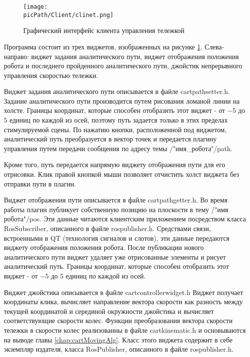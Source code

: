 \documentclass[oneside,final,14pt]{extreport}
\newcommand{\picPath}{img}
\begin{document}
\begin{figure}[H]
\begin{center}
\texttt{[image: \\picPath/Client/clinet.png]}
\end{center}
  \caption{ Графический интерфейс клиента управления тележкой }
  \label{Figure:client}
\end{figure}

Программа состоит из трех виджетов, изображенных на рисунке \ref{Figure:client}. Слева-направо: виджет задания аналитического пути, виджет отображения положения робота и последнего пройденного аналитического пути, джойстик непрерывного управления скоростью тележки.   

Виджет задания аналитического пути описывается в файле cartpathsetter.h. 
Задание аналитического пути производится путем рисования ломаной линии на холсте. Границы координат, которые способен отобразить этот виджет -  от $-5$ до $5$ единиц по каждой из осей, поэтому путь задается только в этих пределах стимулируемой сцены. По нажатию кнопки, расположенной под виджетом, аналитический путь преобразуется в вектор точек и передается плагину управления путем передачи
сообщения по адресу темы /"имя_робота"/path. 
\iffalse
запроса, реализация которого описана в файле server.h. 
\fi
Кроме того, путь передается напрямую виджету отображения пути для его отрисовки. Клик правой кнопкой мыши позволяет отчистить холст виджета без отправки пути в плагин.

Виджет отображения пути описывается в файле cartpathgetter.h. Во время работы плагин публикует собственную позицию на плоскости в тему /"имя робота"/pos.  Эти данные читаются клиентским приложением посредством класса RosSubscriber, описанного в файле rospublisher.h. Средствами связи, встроенными в QT (технология сигналов и слотов), эти данные передаются виджету отображения положения робота. После публикации нового аналитического пути виджет удаляет уже отрисованные элементы и рисует аналитический путь. Границы координат, которые способен отобразить этот виджет - от $-5$ до $5$ единиц по каждой из осей. 

Виджет джойстика описывается в файле cartcontrollerwidget.h
Виджет получает координаты клика, вычисляет направление вектора скорости как разность между текущей координатой и серединой окружности джойстика  и вычисляет соответствующие скорости колес.  Функции преобразования вектора скорости тележки в скорости колес реализованны в файле cartkinematic.h и основываются на выводе главы \ref{chap:cartMovingAlg}. 
Класс этого виджета содержит в себе экземпляр издателя, класса RosPublisher, описанного в файле rospublisher.h.
\end{document}
